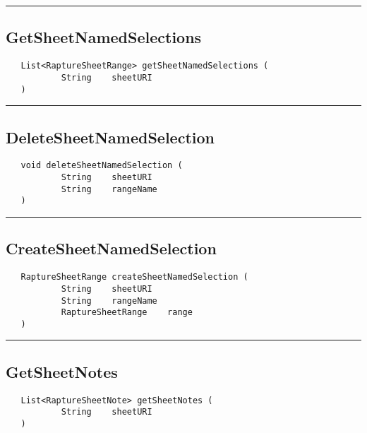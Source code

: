 \rule{15cm}{2pt}
\subsection{GetSheetNamedSelections}
\label{Api:GetSheetNamedSelections}
\begin{verbatim}
   List<RaptureSheetRange> getSheetNamedSelections (
           String    sheetURI
   )
\end{verbatim}



\rule{15cm}{2pt}
\subsection{DeleteSheetNamedSelection}
\label{Api:DeleteSheetNamedSelection}
\begin{verbatim}
   void deleteSheetNamedSelection (
           String    sheetURI
           String    rangeName
   )
\end{verbatim}



\rule{15cm}{2pt}
\subsection{CreateSheetNamedSelection}
\label{Api:CreateSheetNamedSelection}
\begin{verbatim}
   RaptureSheetRange createSheetNamedSelection (
           String    sheetURI
           String    rangeName
           RaptureSheetRange    range
   )
\end{verbatim}



\rule{15cm}{2pt}
\subsection{GetSheetNotes}
\label{Api:GetSheetNotes}
\begin{verbatim}
   List<RaptureSheetNote> getSheetNotes (
           String    sheetURI
   )
\end{verbatim}



